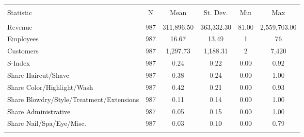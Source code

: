 
\begin{table}[!htbp] \centering 
  \caption{} 
  \label{} 
\begin{tabular}{@{\extracolsep{5pt}}lccccc} 
\\[-1.8ex]\hline 
\hline \\[-1.8ex] 
Statistic & \multicolumn{1}{c}{N} & \multicolumn{1}{c}{Mean} & \multicolumn{1}{c}{St. Dev.} & \multicolumn{1}{c}{Min} & \multicolumn{1}{c}{Max} \\ 
\hline \\[-1.8ex] 
Revenue & 987 & 311,896.50 & 363,332.30 & 81.00 & 2,559,703.00 \\ 
Employees & 987 & 16.67 & 13.49 & 1 & 76 \\ 
Customers & 987 & 1,297.73 & 1,188.31 & 2 & 7,420 \\ 
S-Index & 987 & 0.24 & 0.22 & 0.00 & 0.92 \\ 
Share Haircut/Shave & 987 & 0.38 & 0.24 & 0.00 & 1.00 \\ 
Share Color/Highlight/Wash & 987 & 0.42 & 0.21 & 0.00 & 0.93 \\ 
Share Blowdry/Style/Treatment/Extensions & 987 & 0.11 & 0.14 & 0.00 & 1.00 \\ 
Share Administrative & 987 & 0.05 & 0.15 & 0.00 & 1.00 \\ 
Share Nail/Spa/Eye/Misc. & 987 & 0.03 & 0.10 & 0.00 & 0.79 \\ 
\hline \\[-1.8ex] 
\end{tabular} 
\end{table} 
